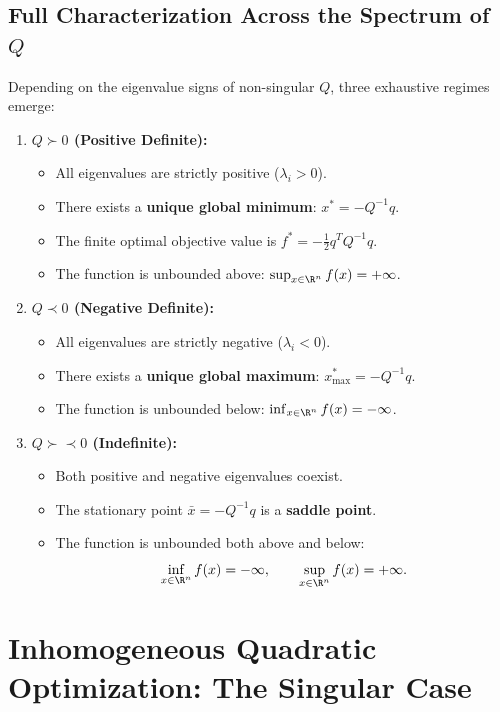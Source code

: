 \subsection{Full Characterization Across the Spectrum of \texorpdfstring{$Q$}{Q}}
Depending on the eigenvalue signs of non-singular $Q$, three exhaustive regimes emerge:
\begin{enumerate}
    \item \textbf{$Q \succ 0$ (Positive Definite):}
    \begin{itemize}
        \item All eigenvalues are strictly positive ($\lambda_i > 0$).
        \item There exists a \textbf{unique global minimum}: $x^* = -Q^{-1} q$.
        \item The finite optimal objective value is $f^* = -\frac{1}{2} q^T Q^{-1} q$.
        \item The function is unbounded above: $\sup_{x \in \R^n} f(x) = +\infty$.
    \end{itemize}
    \item \textbf{$Q \prec 0$ (Negative Definite):}
    \begin{itemize}
        \item All eigenvalues are strictly negative ($\lambda_i < 0$).
        \item There exists a \textbf{unique global maximum}: $x_{\max}^* = -Q^{-1} q$.
        \item The function is unbounded below: $\inf_{x \in \R^n} f(x) = -\infty$.
    \end{itemize}
    \item \textbf{$Q \succ\prec 0$ (Indefinite):}
    \begin{itemize}
        \item Both positive and negative eigenvalues coexist.
        \item The stationary point $\bar{x} = -Q^{-1} q$ is a \textbf{saddle point}.
        \item The function is unbounded both above and below:
        \begin{equation}
            \inf_{x \in \R^n} f(x) = -\infty, \qquad \sup_{x \in \R^n} f(x) = +\infty.
        \end{equation}
    \end{itemize}
\end{enumerate}


\FloatBarrier
\section{Inhomogeneous Quadratic Optimization: The Singular Case}
\label{sec:inhomogeneous-quadratic-singular}

